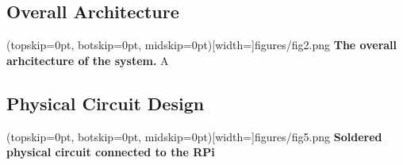 \documentclass{ieeeaccess}
\begin{document}
\subsection{Overall Architecture}
\Figure[t!](topskip=0pt, botskip=0pt,
midskip=0pt)[width=\textwidth]{{figures/fig2.png}}
{ \textbf{The overall arhcitecture of the system.}\label{fig1}}
A


\subsection{Physical Circuit Design}

\Figure[t!](topskip=0pt, botskip=0pt,
midskip=0pt)[width=\textwidth]{{figures/fig5.png}}
{ \textbf{Soldered physical circuit connected to the RPi}\label{fig2}}
\end{document}
